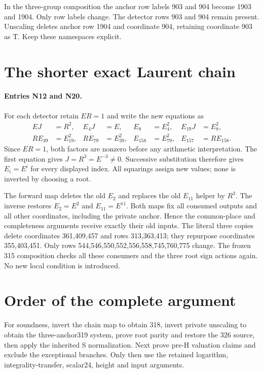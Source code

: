 \documentclass{article}
\begin{document}
In the three-group composition the anchor row labels 903 and 904 become
1903 and 1904. Only row labels change. The detector rows 903 and 904
remain present. Unscaling deletes anchor row 1904 and coordinate 904,
retaining coordinate 903 as T. Keep these namespaces explicit.

\section{The shorter exact Laurent chain}
\label{outline:chain}
\paragraph{Entries N12 and N20.}
For each detector retain $ER=1$ and write the new equations as
\begin{align*}
 EJ&=R^2,&E_4J&=E,&E_8&=E_4^2,&E_{19}J&=E_8^2,\\
 RE_{39}&=E_{19}^2,&RE_{79}&=E_{39}^2,&
 E_{158}&=E_{79}^2,&E_{157}&=RE_{158}.
\end{align*}
Since $ER=1$, both factors are nonzero before any arithmetic
interpretation. The first equation gives $J=R^3=E^{-3}\ne0$.
Successive substitution therefore gives $E_i=E^i$ for every displayed
index. All squarings assign new values; none is inverted by choosing a root.

The forward map deletes the old $E_2$ and replaces the old $E_{11}$
helper by $R^3$. The inverse restores $E_2=E^2$ and $E_{11}=E^{11}$.
Both maps fix all consumed outputs and all other coordinates, including
the private anchor. Hence the common-place and completeness arguments
receive exactly their old inputs. The literal three copies delete
coordinates 361,409,457 and rows 313,363,413; they repurpose coordinates
355,403,451. Only rows 544,546,550,552,556,558,745,760,775 change.
The frozen 315 composition checks all these consumers and the three root
sign actions again. No new local condition is introduced.

\section{Order of the complete argument}
\label{outline:composition}
For soundness, invert the chain map to obtain 318, invert private
unscaling to obtain the three-anchor319 system, prove root parity and
restore the 326 source, then apply the inherited S normalization.
Next prove pre-H valuation claims and exclude the exceptional branches.
Only then use the retained logarithm, integrality-transfer, scalar24,
height and input arguments.
\end{document}
